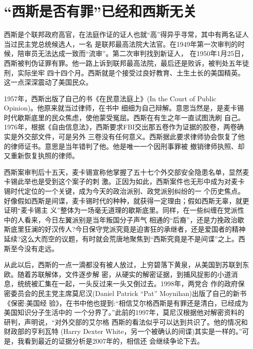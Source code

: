 \documentclass[10pt]{article}
\begin{document}
{

\pagebreak
\section{ ``西斯是否有罪''已经和西斯无关}

西斯是个联邦政府高官，在法庭作证的证人也就``高''得异乎寻常，其中有两名证人当过民主党总统候选人，一名
是联邦最高法院大法官。在1949年第一次审判的时候，陪审员无法达成一致而``流审''。第二次审判找到新证人，
在1950年1月25日，西斯被判伪证罪有罪。他一路上诉到联邦最高法院，最后还是败诉，被判处五年徒刑，实际坐牢
四十四个月。西斯就是个接受过良好教育、土生土长的美国精英。这一点深深震动了美国民众。

1957年，西斯出版了自己的书《在民意法庭上》(In the Court of Public Opinion)。他原来就当过律师，在书中
细细为自己辩解。意思当然是，是麦卡锡时代歇斯底里的民众焦虑，使他蒙受冤屈。西斯在有生之年一直试图洗刷
自己。1976年，根据《自由信息法》，西斯要求FBI交出那五卷作为证据的胶卷，两卷确实是外交部文件，可是另外
三卷没有任何意义。西斯据此要求律师协会恢复了他的律师证书。意思是当年错判了他。他是唯一一个因刑事罪被
撤销律师执照、却又重新恢复执照的律师。

西斯案审判后十五天，麦卡锡宣称他掌握了五十七个外交部安全隐患名单，显然麦卡锡此举也是受到这个案子的刺
激。正因为如此，西斯案件也无形中成为对麦卡锡时代定位的一个关键，成为今天的政治派别、政党派别纠纷的一
个历史焦点。好像假如西斯是间谍，麦卡锡时代的种种，就获得一定理由；假如西斯无辜，就更证明``麦卡锡主
义''整体为一场毫无道理的歇斯底里。同样，在一些纠缠在党派性中的人看来，今日左翼派别是当年叛国分子声气
相通的``后裔''，还是力挽政治歇斯底里狂澜的好汉传人?今日保守党派究竟是迫害狂的承继者，还是爱国者的精神
延续?这么大而空的议题，有时就会荒唐地聚焦到``西斯究竟是不是间谍''之上。西斯至今没有走远。

从此以后，西斯的一点一滴都没有被人放过，上穷碧落下黄泉，从美国到苏联到东欧。随着苏联解体，文件逐步解
密，从硬实的解密证据，到捕风捉影的小道消息，统统被汇集在一起，一头反过来一头又倒过去。1998年，两党合
作的政府保密委员会的民主党主席莫尼汉(Daniel Patrick ``Pat'' Moynihan)出版了自己的新书《保密:美国经
验》，在书中他也提到:``相信艾尔格\textperiodcentered 西斯是有罪还是清白，已经成为美国知识分子生活中的
一个分界了。''此前的1997年，莫尼汉根据他对解密资料的研判，声明说，``对外交部的艾尔格
\textperiodcentered 西斯的看法似乎可以达到共识了。他的情况和财政部的亨利\textperiodcentered 瓦特
(Harry Dexter White，另一个被确认的间谍)其实是一样的。''可是，我看到最近的证据分析是2007年的，相信还
会继续争论下去。

}
\end{document}
